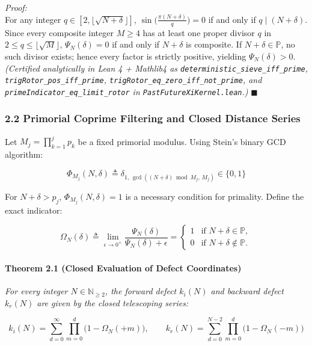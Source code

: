 \documentclass[
  11pt,
]{article}
\begin{document}
\emph{Proof:}\\
For any integer \(q \in [2, \lfloor\sqrt{N+\delta}\rfloor]\),
\(\sin\big(\frac{\pi(N+\delta)}{q}\big) = 0\) if and only if
\(q \mid (N+\delta)\). Since every composite integer \(M \ge 4\) has at
least one proper divisor \(q\) in
\(2 \le q \le \lfloor\sqrt{M}\rfloor\), \(\Psi_N(\delta) = 0\) if and
only if \(N+\delta\) is composite. If \(N+\delta \in \mathbb{P}\), no
such divisor exists; hence every factor is strictly positive, yielding
\(\Psi_N(\delta) > 0\). \emph{(Certified analytically in Lean 4 +
Mathlib4 as \texttt{deterministic\_sieve\_iff\_prime},
\texttt{trigRotor\_pos\_iff\_prime},
\texttt{trigRotor\_eq\_zero\_iff\_not\_prime}, and
\texttt{primeIndicator\_eq\_limit\_rotor} in
\texttt{PastFutureXiKernel.lean}.)} \(\blacksquare\)

\subsubsection{2.2 Primorial Coprime Filtering and Closed Distance
Series}\label{primorial-coprime-filtering-and-closed-distance-series}

Let \(M_j = \prod_{k=1}^j p_k\) be a fixed primorial modulus. Using
Stein's binary GCD algorithm:

\[\Phi_{M_j}(N, \delta) \triangleq \delta_{1, \, \gcd\left((N+\delta)\bmod M_j, \, M_j\right)} \in \{0, 1\}\]

For \(N + \delta > p_j\), \(\Phi_{M_j}(N, \delta) = 1\) is a necessary
condition for primality. Define the exact indicator:

\[\Omega_N(\delta) \triangleq \lim_{\epsilon \to 0^+} \frac{\Psi_N(\delta)}{\Psi_N(\delta) + \epsilon} = \begin{cases} 1 & \text{if } N+\delta \in \mathbb{P}, \\ 0 & \text{if } N+\delta \notin \mathbb{P}. \end{cases}\]

\paragraph{Theorem 2.1 (Closed Evaluation of Defect
Coordinates)}\label{theorem-2.1-closed-evaluation-of-defect-coordinates}

\emph{For every integer \(N \in \mathbb{N}_{\ge 2}\), the forward defect
\(k_i(N)\) and backward defect \(k_r(N)\) are given by the closed
telescoping series:}

\[k_i(N) = \sum_{d=0}^{\infty} \prod_{m=0}^{d} \big(1 - \Omega_N(+m)\big), \qquad k_r(N) = \sum_{d=0}^{N-2} \prod_{m=0}^{d} \big(1 - \Omega_N(-m)\big)\]
\end{document}

